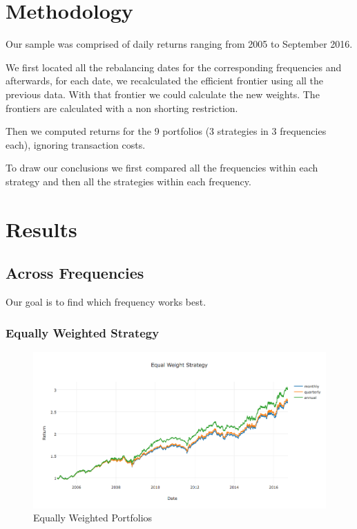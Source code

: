 \documentclass[paper=a4, fontsize=11pt]{scrartcl} %
\numberwithin{equation}{section} %
\numberwithin{figure}{section} %
\numberwithin{table}{section} %
\begin{document}
\section{Methodology}

Our sample was comprised of daily returns ranging from 2005 to September 2016.

We first located all the rebalancing dates for the corresponding frequencies and afterwards, for each date, we recalculated the efficient frontier using all the previous data. With that frontier we could calculate the new weights. The frontiers are calculated with a non shorting restriction.

Then we computed returns for the 9 portfolios (3 strategies in 3 frequencies each), ignoring transaction costs.

To draw our conclusions we first compared all the frequencies within each strategy and then all the strategies within each frequency.

\section{Results}

\subsection{Across Frequencies}

Our goal is to find which frequency works best.

\subsubsection{Equally Weighted Strategy}

\begin{figure}[H]
  \includegraphics[width=\linewidth]{EWFrequencies.png}
  \caption{Equally Weighted Portfolios}
  \label{fig:EWFrequencies}
\end{figure}
\end{document}

